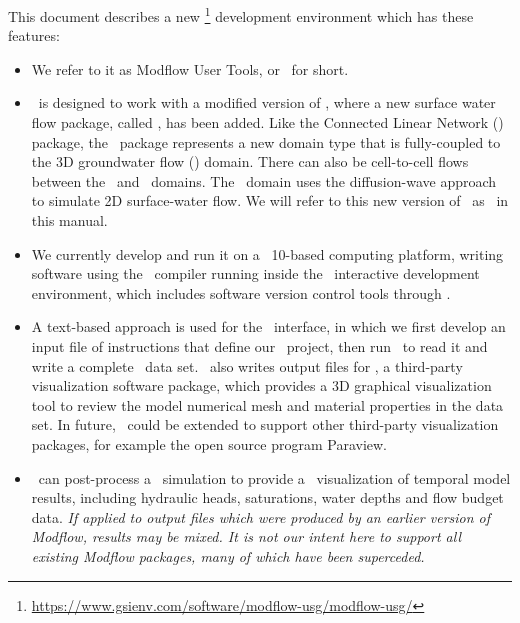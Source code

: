 \label{chapter:Introduction} This document describes a new \mfu\footnote{\url{https://www.gsienv.com/software/modflow-usg/modflow-usg/}}  development environment which has these features:
\begin{itemize}
    \item We refer to it as Modflow User Tools, or \mut\ for short.
    \item \mut\ is designed to work with a modified version of \mfu,  where a new surface water flow package, called \swf, has been added. Like the Connected Linear Network (\cln) package, the \swf\ package represents a new domain type that is fully-coupled to the 3D groundwater flow (\gwf) domain. There can also be cell-to-cell flows between the \swf\ and \cln\ domains.  The \swf\ domain uses the diffusion-wave approach to simulate 2D surface-water flow. We will refer to this new version of \mfu\ as \mfus\ in this manual.
    \item We currently develop and run it on a \windows\ 10-based computing platform, writing software using the \ifort\ compiler running inside the \vstudio\ interactive development environment, which includes software version control tools through \github.
    \item A text-based approach is used for the \mut\ interface, in which we first develop an input file of instructions that define our \mfus\ project,  then run \mut\ to read it and write a complete \mfus\ data set. \mut\ also writes output files for \tecplot, a third-party visualization software package, which provides a 3D graphical visualization tool to review the model numerical mesh and material properties in the data set. In future, \mut\ could be extended to support other third-party visualization packages, for example the open source program Paraview.
    \item \mut\ can post-process a \mfus\ simulation to provide a \tecplot\ visualization of temporal model results, including hydraulic heads, saturations, water depths and flow budget data.  \textit{If applied to output files which were produced by an earlier version of Modflow, results may be mixed.  It is not our intent here to support all existing Modflow packages, many of which have been superceded.}
\end{itemize}

